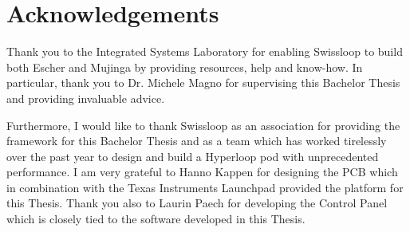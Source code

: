 
\chapter*{Acknowledgements}

Thank you to the Integrated Systems Laboratory\cite{iis} for enabling Swissloop to build both Escher and Mujinga by providing resources, help and know-how. In particular, thank you to Dr. Michele Magno for supervising this Bachelor Thesis and providing invaluable advice.

Furthermore, I would like to thank Swissloop as an association for providing the framework  for this Bachelor Thesis and as a team which has worked tirelessly over the past year to design and build a Hyperloop pod with unprecedented performance. I am very grateful to Hanno Kappen for designing the PCB which in combination with the Texas Instruments Launchpad provided the platform for this Thesis. Thank you also to Laurin Paech for developing the Control Panel which is closely tied to the software developed in this Thesis.